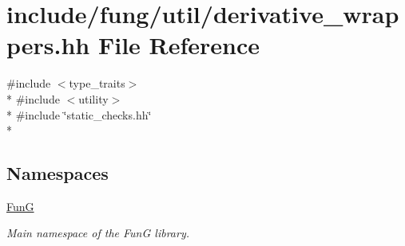 \hypertarget{derivative__wrappers_8hh}{\section{include/fung/util/derivative\-\_\-wrappers.hh File Reference}
\label{derivative__wrappers_8hh}
}
{\ttfamily \#include $<$type\-\_\-traits$>$}\\*
{\ttfamily \#include $<$utility$>$}\\*
{\ttfamily \#include \char`\"{}static\-\_\-checks.\-hh\char`\"{}}\\*
\subsection*{Namespaces}
\begin{DoxyCompactItemize}
\item 
\hyperlink{namespaceFunG}{Fun\-G}
\begin{DoxyCompactList}\small\item\em Main namespace of the Fun\-G library. \end{DoxyCompactList}\end{DoxyCompactItemize}
